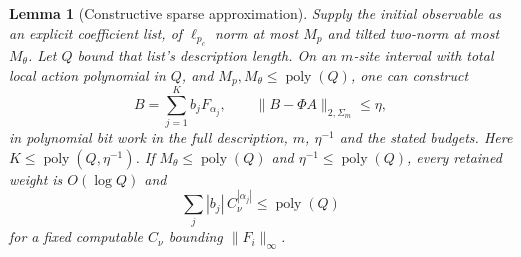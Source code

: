 \documentclass[11pt,reqno]{amsart}
\numberwithin{equation}{section}
\newtheorem{lemma}[theorem]{Lemma}
\theoremstyle{definition}
\theoremstyle{remark}
\newcommand{\poly}{\operatorname{poly}}
\newcommand{\nn}[1]{\lVert#1\rVert}
\begin{document}
\begin{lemma}[Constructive sparse approximation]\label{lem:sparse}
Supply the initial observable as an explicit coefficient list, of $\ell_{p_c}$ norm at most $M_p$ and tilted two-norm at most $M_\theta$. Let $Q$ bound that list's description length. On an $m$-site interval with total local action polynomial in $Q$, and $M_p,M_\theta\leq\poly(Q)$, one can construct
\begin{equation}\label{eq:sparse}
 B=\sum_{j=1}^K b_jF_{\alpha_j},\qquad
 \nn{B-\Phi A}_{2,\Sigma_m}\leq\eta,
\end{equation}
in polynomial bit work in the full description, $m$, $\eta^{-1}$ and the stated budgets. Here $K\leq\poly(Q,\eta^{-1})$. If $M_\theta\leq\poly(Q)$ and $\eta^{-1}\leq\poly(Q)$, every retained weight is $O(\log Q)$ and
\begin{equation}\label{eq:paidnorm}
 \sum_j|b_j|\,C_\nu^{|\alpha_j|}\leq\poly(Q)
\end{equation}
for a fixed computable $C_\nu$ bounding $\nn{F_i}_\infty$.
\end{lemma}
\end{document}
